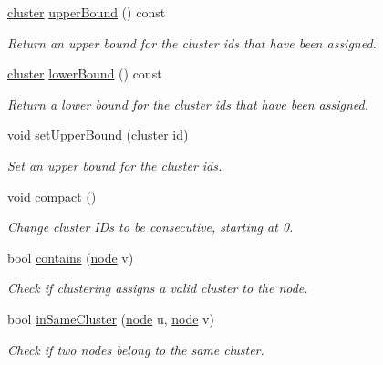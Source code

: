 \begin{DoxyCompactItemize}
\hyperlink{namespace_networ_kit_aee72806475c8d37642866ab18aceab8b}{cluster} \hyperlink{class_networ_kit_1_1_clustering_a1bf0c38a510c8ef384d2ce25f18e1ab6}{upper\-Bound} () const 
\begin{DoxyCompactList}\small\item\em Return an upper bound for the cluster ids that have been assigned. \end{DoxyCompactList}\item 
\hyperlink{namespace_networ_kit_aee72806475c8d37642866ab18aceab8b}{cluster} \hyperlink{class_networ_kit_1_1_clustering_aa67805208c7663502ca951801198cb34}{lower\-Bound} () const 
\begin{DoxyCompactList}\small\item\em Return a lower bound for the cluster ids that have been assigned. \end{DoxyCompactList}\item 
void \hyperlink{class_networ_kit_1_1_clustering_a8810a044c480adc30d5e05263dabf67c}{set\-Upper\-Bound} (\hyperlink{namespace_networ_kit_aee72806475c8d37642866ab18aceab8b}{cluster} id)
\begin{DoxyCompactList}\small\item\em Set an upper bound for the cluster ids. \end{DoxyCompactList}\item 
void \hyperlink{class_networ_kit_1_1_clustering_a549fac681242b49a0864e0e7faba1004}{compact} ()
\begin{DoxyCompactList}\small\item\em Change cluster I\-Ds to be consecutive, starting at 0. \end{DoxyCompactList}\item 
bool \hyperlink{class_networ_kit_1_1_clustering_afe45f9be7aeb735a8560bd5e95324f95}{contains} (\hyperlink{namespace_networ_kit_a61914158fd771265be48de9942369160}{node} v)
\begin{DoxyCompactList}\small\item\em Check if clustering assigns a valid cluster to the node. \end{DoxyCompactList}\item 
bool \hyperlink{class_networ_kit_1_1_clustering_aee9b6c2940d730806cd79f5b52c1d87a}{in\-Same\-Cluster} (\hyperlink{namespace_networ_kit_a61914158fd771265be48de9942369160}{node} u, \hyperlink{namespace_networ_kit_a61914158fd771265be48de9942369160}{node} v)
\begin{DoxyCompactList}\small\item\em Check if two nodes belong to the same cluster. \end{DoxyCompactList}\item 

\end{DoxyCompactItemize}
